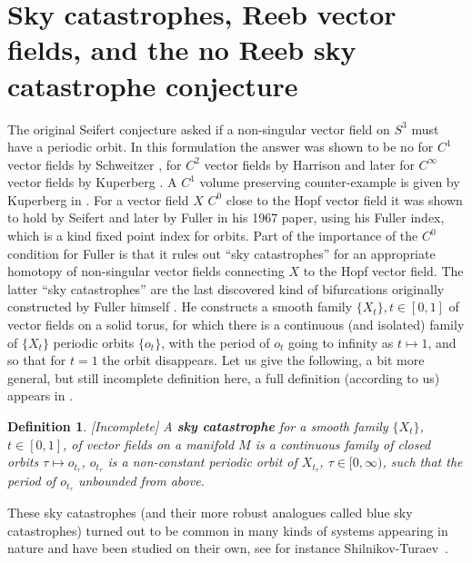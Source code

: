 \documentclass{amsart}
\numberwithin{equation}{section}
\newtheorem{definition}[equation]{Definition}
\theoremstyle{definition}
\theoremstyle{remark}
\begin{document}
\section {Sky catastrophes, Reeb vector fields, and the no Reeb sky catastrophe conjecture}
The original Seifert conjecture  \cite{citeSeifert} asked if a non-singular vector field on $S
^{3} $ must have a periodic orbit. 
In this formulation the answer was shown to
be no for $C
^{1} $ vector fields by
Schweitzer \cite{citeSchweitzerC1Counterexample}, for $C ^{2} $ vector fields by
Harrison \cite{citeHarrison} and later for $C ^{\infty} $ vector fields by Kuperberg \cite{citeKKuperbergSmoothCounterexample}. A $C^1$ volume preserving counter-example is given by Kuperberg in \cite{citeKuperbergvolumepreserving}.
For a vector field $X$ $C^0$ close to the Hopf vector field it was
shown to hold by Seifert and later by Fuller 
\cite{citeFullerIndex} in his 1967 paper, using his Fuller index, which is a kind fixed point index for orbits.
Part of the importance of the  $C
^{0} $ condition for Fuller is
that it rules out ``sky catastrophes'' for an appropriate
homotopy of non-singular vector
fields connecting $X$ to the Hopf vector field. The latter ``sky catastrophes'' 
are the last discovered kind of bifurcations
originally constructed by Fuller himself \cite{citeFullerBlueSky}. 
He constructs a smooth family $\{X _{t} \}, t \in [0,1] $ of vector fields
on a solid torus, 
for which there is a continuous (and isolated) family of $\{X _{t}\} $ periodic orbits
$\{o _{t}\} $,  with the period of $o _{t} $ going
to infinity as $t \mapsto 1$, and so that for $t =1$ the orbit
disappears. Let us give the following, a bit more general, but still incomplete definition here, a full definition (according to us) appears in \cite{citeSavelyevFuller}.
\begin{definition} \label{def:skyPrelim}[Incomplete]  
  A \textbf{\emph{sky catastrophe}} for a smooth family $\{X _{t} \}$, $t \in [0,1]$,
   of vector
   fields on a manifold $M$ is a continuous family of closed orbits $\tau \mapsto o _{t _{\tau} }$, $o _{t _{\tau} } $ is a non-constant periodic orbit of $X _{t _{\tau} } $, $\tau \in [0, \infty)$, such that the period of $o _{t _{\tau} } $ unbounded from above.
\end{definition}
These sky catastrophes (and their more robust analogues called blue sky catastrophes) turned out to be common in many kinds of systems
appearing in nature and have been studied on their own, see for instance
Shilnikov-Turaev~\cite{citeShilnikovTuraevBlueSky}.
\end{document}

